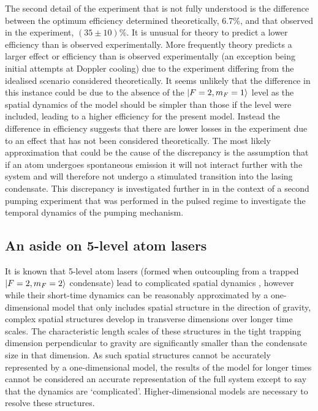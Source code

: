 The second detail of the experiment that is not fully understood is the difference between the optimum efficiency determined theoretically, 6.7\%, and that observed in the experiment, $(35\pm 10)\%$.  It is unusual for theory to predict a lower efficiency than is observed experimentally.  More frequently theory predicts a larger effect or efficiency than is observed experimentally (an exception being initial attempts at Doppler cooling) due to the experiment differing from the idealised scenario considered theoretically.  It seems unlikely that the difference in this instance could be due to the absence of the ${\left|F=2, m_F=1\right>}$ level as the spatial dynamics of the model should be simpler than those if the level were included, leading to a higher efficiency for the present model.  Instead the difference in efficiency suggests that there are lower losses in the experiment due to an effect that has not been considered theoretically.  The most likely approximation that could be the cause of the discrepancy is the assumption that if an atom undergoes spontaneous emission it will not interact further with the system and will therefore not undergo a stimulated transition into the lasing condensate.  This discrepancy is investigated further in  in the context of a second pumping experiment that was performed in the pulsed regime to investigate the temporal dynamics of the pumping mechanism.

\subsection{An aside on 5-level atom lasers}
\label{OpticalPumping:5LevelModel}

It is known that 5-level atom lasers (formed when outcoupling from a trapped ${\left|F=2, m_F=2\right>}$ condensate) lead to complicated spatial dynamics \citep{Dugue:2007fk}, however while their short-time dynamics can be reasonably approximated by a one-dimensional model that only includes spatial structure in the direction of gravity, complex spatial structures develop in transverse dimensions over longer time scales.  The characteristic length scales of these structures in the tight trapping dimension perpendicular to gravity are significantly smaller than the condensate size in that dimension.  As such spatial structures cannot be accurately represented by a one-dimensional model, the results of the model for longer times cannot be considered an accurate representation of the full system except to say that the dynamics are `complicated'.  Higher-dimensional models are necessary to resolve these structures.

